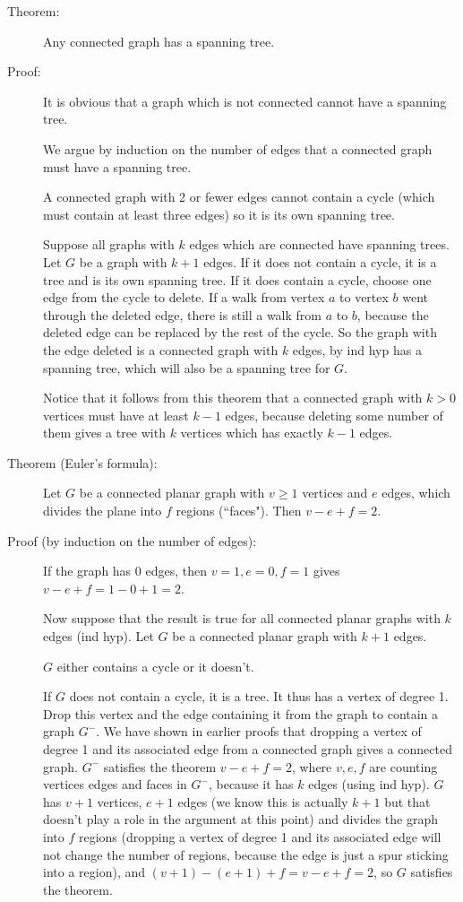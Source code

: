 \documentclass[12pt]{article}
\begin{document}
\begin{description}
\item[Theorem:]  Any connected graph has a spanning tree.  

\item[Proof:]  It is obvious that a graph which is not connected cannot have a spanning tree.

We argue by induction on the number of edges that a connected graph must have a spanning tree.

A connected graph with 2 or fewer edges cannot contain a cycle (which must contain at least three edges)
so it is its own spanning tree.

Suppose all graphs with $k$ edges which are connected have spanning trees.  Let $G$ be a graph with $k+1$ edges.
If it does not contain a cycle, it is a tree and is its own spanning tree.  If it does contain a cycle, choose one edge from the cycle to delete.   If a walk from vertex $a$ to vertex $b$ went through the deleted edge, there is still a walk from $a$ to $b$, because the deleted edge can be replaced by the rest of the cycle.  So the graph with the edge deleted is a connected graph with $k$ edges, by ind hyp has a spanning tree, which will also be a spanning tree for $G$.

Notice that it follows from this theorem that a connected graph with $k>0$ vertices must have at least $k-1$ edges,
because deleting some number of them gives a tree with $k$ vertices which has exactly $k-1$ edges.

\item[Theorem (Euler's formula):]  Let $G$ be a connected planar graph with $v\geq 1$ vertices and $e$ edges, which divides the plane into $f$ regions (``faces").  Then $v-e+f=2$.

\item[Proof (by induction on the number of edges):]  If the graph has 0 edges, then $v=1, e=0, f=1$ gives $v-e+f = 1-0+1 = 2$.

Now suppose that the result is true for all connected planar graphs with $k$ edges (ind hyp).  Let $G$ be a connected planar graph with $k+1$ edges. 

$G$ either contains a cycle or it doesn't.

If $G$ does not contain a cycle, it is a tree.  It thus has a vertex of degree 1.  Drop this vertex and the edge containing it from the graph to contain a graph $G^-$.  We have shown in earlier proofs that dropping a vertex of degree 1 and its associated edge from a connected graph gives a connected graph.  $G^-$ satisfies the theorem $v-e+f=2$, where $v,e,f$ are counting vertices edges and faces in $G^-$, because it has $k$ edges (using ind hyp).  $G$ has $v+1$ vertices, $e+1$ edges (we know this is actually $k+1$ but that doesn't play a role in the argument at this point) and divides the graph into $f$ regions (dropping a vertex of degree 1 and its associated edge will not change the number of regions, because the edge is just a spur sticking into a region),
and $(v+1)-(e+1)+f = v-e+f = 2$, so $G$ satisfies the theorem.


\end{description}
\end{document}
